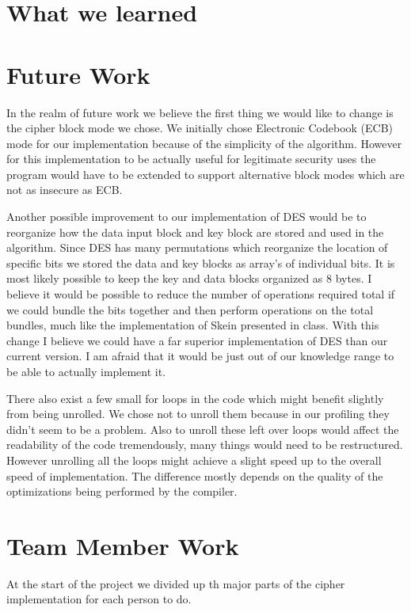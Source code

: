 \documentclass[10pt]{article}
\begin{document}
\section{What we learned}

\section{Future Work}

  In the realm of future work we believe the first thing we would like to change is the cipher block mode we chose.
  We initially chose Electronic Codebook (ECB) mode for our implementation because of the simplicity of the algorithm.
  However for this implementation to be actually useful for legitimate security uses the program would have to be extended
  to support alternative block modes which are not as insecure as ECB.

  Another possible improvement to our implementation of DES would be to reorganize how the data input block and key block
  are stored and used in the algorithm. Since DES has many permutations which reorganize the location of specific bits we 
  stored the data and key blocks as array's of individual bits. It is most likely possible to keep the key and data blocks
  organized as 8 bytes. I believe it would be possible to reduce the number of operations required total if we could bundle the 
  bits together and then perform operations on the total bundles, much like the implementation of Skein presented in class. 
  With this change I believe we could have a far superior implementation of DES than our current version. I am afraid that it
  would be just out of our knowledge range to be able to actually implement it. 

  There also exist a few small for loops in the code which might benefit slightly from being unrolled.
  We chose not to unroll them because in our profiling they didn't seem to be a problem. Also to unroll
  these left over loops would affect the readability of the code tremendously, many things would need to be 
  restructured. However unrolling all the loops might achieve a slight speed up to the overall speed of implementation.
  The difference mostly depends on the quality of the optimizations being performed by the compiler.

\section{Team Member Work}

  At the start of the project we divided up th major parts of the cipher implementation for each person to do. \\
\end{document}
